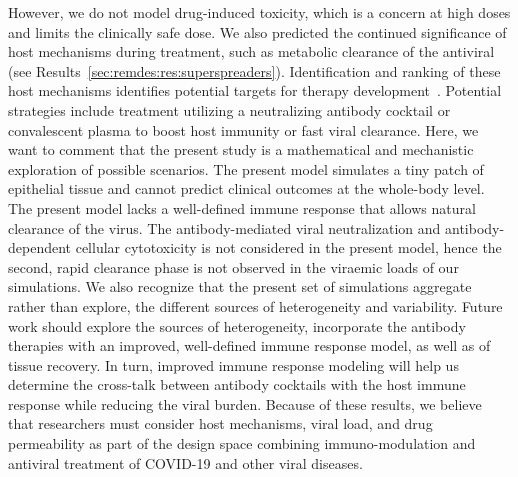 However, we do not model drug-induced toxicity, which is a concern at high doses and limits the clinically safe dose. We also predicted the continued significance of host mechanisms during treatment, such as metabolic clearance of the antiviral (see Results~\ref{sec:remdes:res:superspreaders}). Identification and ranking of these host mechanisms identifies potential targets for therapy development~\cite{abani_tocilizumab_2021,chen_corticosteroid_2021}.  Potential strategies include treatment utilizing a neutralizing antibody cocktail or convalescent plasma to boost host immunity or fast viral clearance. Here, we want to comment that the present study is a mathematical and mechanistic exploration of possible scenarios. The present model simulates a tiny patch of epithelial tissue and cannot predict clinical outcomes at the whole-body level. The present model lacks a well-defined immune response that allows natural clearance of the virus. The antibody-mediated viral neutralization and antibody-dependent cellular cytotoxicity is not considered in the present model, hence the second, rapid clearance phase is not observed in the viraemic loads of our simulations. We also recognize that the present set of simulations aggregate rather than explore, the different sources of heterogeneity and variability. Future work should explore the sources of heterogeneity, incorporate the antibody therapies with an improved, well-defined immune response model, as well as of tissue recovery. In turn, improved immune response modeling will help us determine the cross-talk between antibody cocktails with the host immune response while reducing the viral burden. Because of these results, we believe that researchers must consider host mechanisms, viral load, and drug permeability as part of the design space combining immuno-modulation and antiviral treatment of COVID-19 and other viral diseases.


